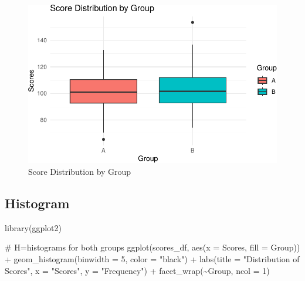 \documentclass[
  singlecolumn]{article}
\newenvironment{Shaded}{}{}
\newcommand{\AttributeTok}[1]{\textcolor[rgb]{0.84,0.23,0.29}{#1}}
\newcommand{\CommentTok}[1]{\textcolor[rgb]{0.42,0.45,0.49}{#1}}
\newcommand{\DecValTok}[1]{\textcolor[rgb]{0.00,0.36,0.77}{#1}}
\newcommand{\FunctionTok}[1]{\textcolor[rgb]{0.44,0.26,0.76}{#1}}
\newcommand{\NormalTok}[1]{\textcolor[rgb]{0.14,0.16,0.18}{#1}}
\newcommand{\SpecialCharTok}[1]{\textcolor[rgb]{0.00,0.36,0.77}{#1}}
\newcommand{\StringTok}[1]{\textcolor[rgb]{0.01,0.18,0.38}{#1}}
\theoremstyle{definition}
\theoremstyle{remark}
\begin{document}
\begin{figure}[H]

{\centering \includegraphics{02-content_files/figure-pdf/visualize-data-1.pdf}

}

\caption{Score Distribution by Group}

\end{figure}%

\subsection{Histogram}\label{sec-histogram}

\begin{Shaded}
\begin{Highlighting}[]
\FunctionTok{library}\NormalTok{(ggplot2)}

\CommentTok{\# H=histograms for both groups}
\FunctionTok{ggplot}\NormalTok{(scores\_df, }\FunctionTok{aes}\NormalTok{(}\AttributeTok{x =}\NormalTok{ Scores, }\AttributeTok{fill =}\NormalTok{ Group)) }\SpecialCharTok{+}
  \FunctionTok{geom\_histogram}\NormalTok{(}\AttributeTok{binwidth =} \DecValTok{5}\NormalTok{, }\AttributeTok{color =} \StringTok{"black"}\NormalTok{) }\SpecialCharTok{+}
  \FunctionTok{labs}\NormalTok{(}\AttributeTok{title =} \StringTok{"Distribution of Scores"}\NormalTok{,}
       \AttributeTok{x =} \StringTok{"Scores"}\NormalTok{,}
       \AttributeTok{y =} \StringTok{"Frequency"}\NormalTok{) }\SpecialCharTok{+}
  \FunctionTok{facet\_wrap}\NormalTok{(}\SpecialCharTok{\textasciitilde{}}\NormalTok{Group, }\AttributeTok{ncol =} \DecValTok{1}\NormalTok{)}
\end{Highlighting}
\end{Shaded}
\end{document}
